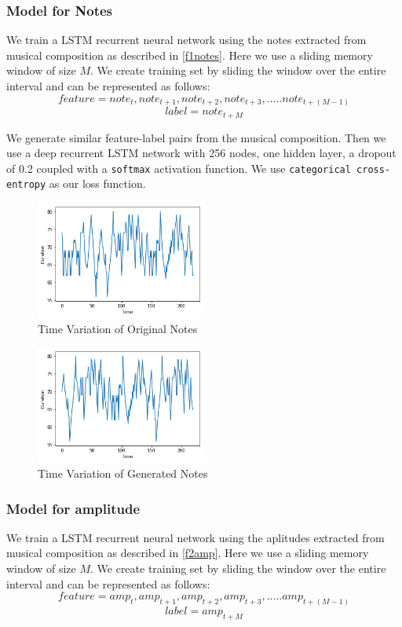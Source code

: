 \documentclass[conference]{IEEEtran}
\begin{document}
\subsubsection{Model for Notes}
We train a LSTM recurrent neural network using the notes extracted from musical composition as described in \ref{f1notes}. Here we use a sliding memory window of size $M$. We create training set by sliding the window over the entire interval and can be represented as follows:
$$feature = {note_{t},note_{t+1},note_{t+2},note_{t+3},.....note_{t+(M-1)}}$$
$$label = {note_{t+M}}$$

We generate similar feature-label pairs from the musical composition. Then we use a deep recurrent LSTM network with 256 nodes, one hidden layer, a dropout of 0.2 coupled with a \texttt{softmax} activation function. We use \texttt{categorical cross-entropy} as our loss function.\\

\begin{figure}[h]
\includegraphics[width=0.5\textwidth]{IEEEtran/notes_o.png}
\caption{Time Variation of Original Notes}
\label{fig:figure1}
\end{figure}

\begin{figure}[h]
\includegraphics[width=0.5\textwidth]{IEEEtran/notes_g.png}
\caption{Time Variation of Generated Notes}
\label{fig:figure2}
\end{figure}

\subsubsection{Model for amplitude}
We train a LSTM recurrent neural network using the aplitudes extracted from musical composition as described in \ref{f2amp}. Here we use a sliding memory window of size $M$. We create training set by sliding the window over the entire interval and can be represented as follows:
$$feature = {amp_{t},amp_{t+1},amp_{t+2},amp_{t+3},.....amp_{t+(M-1)}}$$
$$label = {amp_{t+M}}$$
\end{document}
